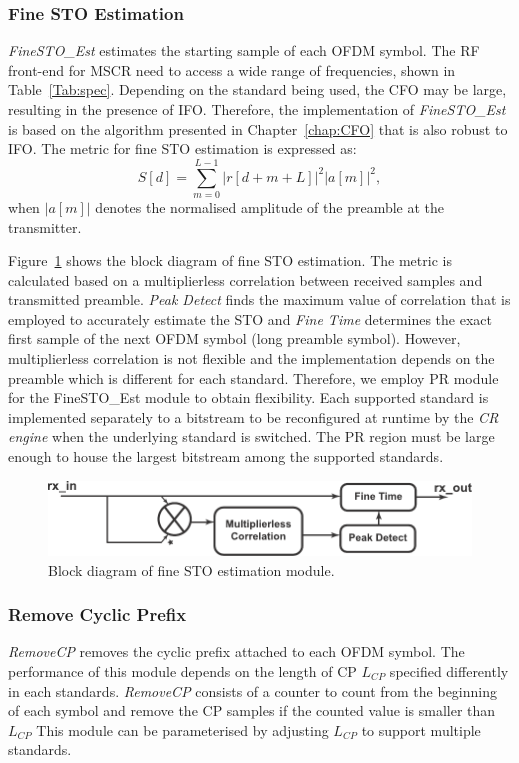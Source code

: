 \subsubsection{Fine STO Estimation}
\emph{FineSTO\_Est} estimates the starting sample of each OFDM symbol.
The RF front-end for MSCR need to access a wide range of frequencies, shown in Table~\ref{Tab:spec}. Depending on the standard being used, the CFO may be large, resulting in the presence of IFO.
Therefore, the implementation of \emph{FineSTO\_Est} is based on the algorithm presented in Chapter~\ref{chap:CFO} that is also robust to IFO.
The metric for fine STO estimation is expressed as:
\begin{equation}
\label{ProposedR}
S[d] =\sum_{m =0}^{L-1}   |r[d+m+L]|^2  |a[m]|^2,
\end{equation}
when $|a[m]|$ denotes the normalised amplitude of the preamble at the transmitter.

Figure~\ref{fig:STO} shows the block diagram of fine STO estimation.
The metric is calculated based on a multiplierless correlation between received samples and transmitted preamble.
\emph{Peak Detect} finds the maximum value of correlation that is employed to accurately estimate the STO and \emph{Fine Time} determines the exact first sample of the next OFDM symbol (long preamble symbol).
However, multiplierless correlation is not flexible and the implementation depends on the preamble which is different for each standard.
Therefore, we employ PR module for the {FineSTO\_Est} module to obtain flexibility.
Each supported standard is implemented separately to a bitstream to be reconfigured at runtime by the \emph{CR engine} when the underlying standard is switched.
The PR region must be large enough to house the largest bitstream among the supported standards.
\begin{figure}
\centering
\includegraphics [width=0.6\columnwidth]{Figures/MSCR_RX_STO.pdf}
\caption{Block diagram of fine STO estimation module.}
\label{fig:STO}
\end{figure}

\subsubsection{Remove Cyclic Prefix}
\emph{RemoveCP} removes the cyclic prefix attached to each OFDM symbol.
The performance of this module depends on the length of CP $L_{CP}$ specified differently in each standards.
\emph{RemoveCP} consists of a counter to count from the beginning of each symbol and remove the CP samples if the counted value is smaller than $L_{CP}$
This module can be parameterised by adjusting $L_{CP}$ to support multiple standards.

